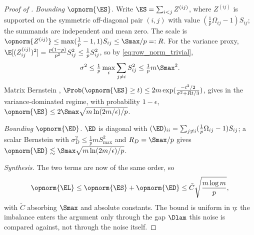 \begin{proof}[Proof of ]
\emph{Bounding $\opnorm{\ES}$.} Write $\ES=\sum_{i<j}Z^{(ij)}$, where $Z^{(ij)}$
is supported on the symmetric off-diagonal pair $(i,j)$ with value
$(\tfrac1p\Omega_{ij}-1)S_{ij}$;
the summands are independent and mean zero. The scale is
$\opnorm{Z^{(ij)}}\le\max(\tfrac1p-1,1)S_{ij}\le\Smax/p=:R$. For the variance proxy,
$\E[(Z^{(ij)}_{ij})^2]=\tfrac{p(1-p)}{p^2}S_{ij}^2\le\tfrac1pS_{ij}^2$, so by
\eqref{eq:row_norm_trivial},
\[
   \sigma^2\le\tfrac1p\max_i\sum_{j\ne i}S_{ij}^2\le\tfrac1p m\Smax^2 .
\]
Matrix Bernstein \cite{tropp2012userfriendly},
$\Prob(\opnorm{\ES}\ge t)\le2m\exp(\tfrac{-t^2/2}{\sigma^2+Rt/3})$, gives in the
variance-dominated regime, with probability $1-\epsilon$,
$\opnorm{\ES}\le2\Smax\sqrt{m\ln(2m/\epsilon)/p}$.

\emph{Bounding $\opnorm{\ED}$.} $\ED$ is diagonal with
$(\ED)_{ii}=\sum_{j\ne i}(\tfrac1p\Omega_{ij}-1)S_{ij}$; a scalar Bernstein with
$\sigma_D^2\le\tfrac1p mS_{\max}^2$ and $R_D=\Smax/p$ gives
$\opnorm{\ED}\lesssim\Smax\sqrt{m\ln(2m/\epsilon)/p}$.

\emph{Synthesis.} The two terms are now of the same order, so
\[
   \opnorm{\EL}\le\opnorm{\ES}+\opnorm{\ED}\le\tilde C\sqrt{\frac{m\log m}{p}},
\]
with $\tilde C$ absorbing $\Smax$ and absolute constants. The bound is uniform in
$\eta$: the imbalance enters the argument only through the gap $\Dlam$ this noise
is compared against, not through the noise itself.
\end{proof}
